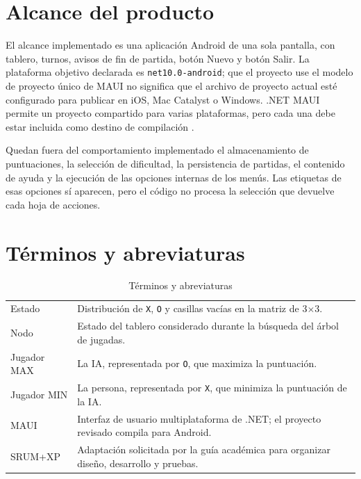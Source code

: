 \section{Alcance del producto}
El alcance implementado es una aplicación Android de una sola pantalla, con tablero, turnos, avisos de fin de partida, botón Nuevo y botón Salir. La plataforma objetivo declarada es \texttt{net10.0-android}; que el proyecto use el modelo de proyecto único de MAUI no significa que el archivo de proyecto actual esté configurado para publicar en iOS, Mac Catalyst o Windows. .NET MAUI permite un proyecto compartido para varias plataformas, pero cada una debe estar incluida como destino de compilación \cite{mauiSingle}.

Quedan fuera del comportamiento implementado el almacenamiento de puntuaciones, la selección de dificultad, la persistencia de partidas, el contenido de ayuda y la ejecución de las opciones internas de los menús. Las etiquetas de esas opciones sí aparecen, pero el código no procesa la selección que devuelve cada hoja de acciones.

\section{Términos y abreviaturas}
\begin{table}[H]
\centering
\small
\caption{Términos y abreviaturas}\label{tab:terms}
\begin{tabular}{P{3.0cm}P{11.5cm}}
\toprule
{} & \\
\midrule
Estado & Distribución de \texttt{X}, \texttt{O} y casillas vacías en la matriz de 3$\times$3.\\
Nodo & Estado del tablero considerado durante la búsqueda del árbol de jugadas.\\
Jugador MAX & La IA, representada por \texttt{O}, que maximiza la puntuación.\\
Jugador MIN & La persona, representada por \texttt{X}, que minimiza la puntuación de la IA.\\
MAUI & Interfaz de usuario multiplataforma de .NET; el proyecto revisado compila para Android.\\
SRUM+XP & Adaptación solicitada por la guía académica para organizar diseño, desarrollo y pruebas.\\
\bottomrule
\end{tabular}
\end{table}

